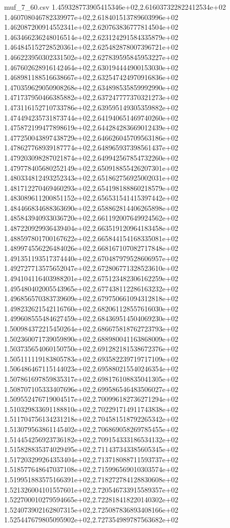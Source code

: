 \begin{filecontents*}{muf_7_60.csv}
1.459328773905415346e+02,2.616037322822412534e+02
1.460708046782339977e+02,2.618401513789603996e+02
1.462087200914552341e+02,2.620763836777814504e+02
1.463466236248016514e+02,2.623124291584335879e+02
1.464845152728520361e+02,2.625482878007396721e+02
1.466223950302331502e+02,2.627839595845953227e+02
1.467602628916142464e+02,2.630194444900153030e+02
1.468981188516638667e+02,2.632547424970916836e+02
1.470359629050908268e+02,2.634898535859992990e+02
1.471737950466385882e+02,2.637247777370321273e+02
1.473116152710733786e+02,2.639595149305359882e+02
1.474494235731873744e+02,2.641940651469740260e+02
1.475872199477898619e+02,2.644284283669012439e+02
1.477250043897438729e+02,2.646626045709563186e+02
1.478627768939187774e+02,2.648965937398561437e+02
1.479203098287021874e+02,2.649942567854732260e+02
1.479778405680252149e+02,2.650918855426207301e+02
1.480334812493252343e+02,2.651862756925002031e+02
1.481712270469460293e+02,2.654198188860218579e+02
1.483089611200851152e+02,2.656531541415397442e+02
1.484466834688363690e+02,2.658862814406265898e+02
1.485843940933036720e+02,2.661192007649924562e+02
1.487220929936439404e+02,2.663519120964183458e+02
1.488597801700167622e+02,2.665844154168335081e+02
1.489974556226484026e+02,2.668167107082717848e+02
1.491351193517374440e+02,2.670487979528606957e+02
1.492727713575652047e+02,2.672806771328523610e+02
1.494104116403988201e+02,2.675123482306162259e+02
1.495480402005543965e+02,2.677438112286163232e+02
1.496856570383739609e+02,2.679750661094312818e+02
1.498232621542116760e+02,2.682061128557616030e+02
1.499608555484627459e+02,2.684369514504069230e+02
1.500984372215450264e+02,2.686675818762723793e+02
1.502360071739059890e+02,2.688980041163868009e+02
1.503735654060150750e+02,2.691282181538672376e+02
1.505111119183805783e+02,2.693582239719717109e+02
1.506486467115144023e+02,2.695880215540246354e+02
1.507861697859835317e+02,2.698176108835041305e+02
1.508707105333407696e+02,2.699586546483506027e+02
1.509552476719004517e+02,2.700996182736271294e+02
1.510329833691188810e+02,2.702291714911743838e+02
1.511704756134231218e+02,2.704581518792265342e+02
1.513079563861145402e+02,2.706869058269785455e+02
1.514454256923736182e+02,2.709154333186534132e+02
1.515828835374029495e+02,2.711437343385605345e+02
1.517203299264353404e+02,2.713718088711593737e+02
1.518577648647037108e+02,2.715996569010303574e+02
1.519951883575166391e+02,2.718272784128830608e+02
1.521326004101557601e+02,2.720546733915589357e+02
1.522700010279594665e+02,2.722818418220140302e+02
1.524073902162807315e+02,2.725087836893408166e+02
1.525447679805095902e+02,2.727354989787563682e+02

\end{filecontents*}
